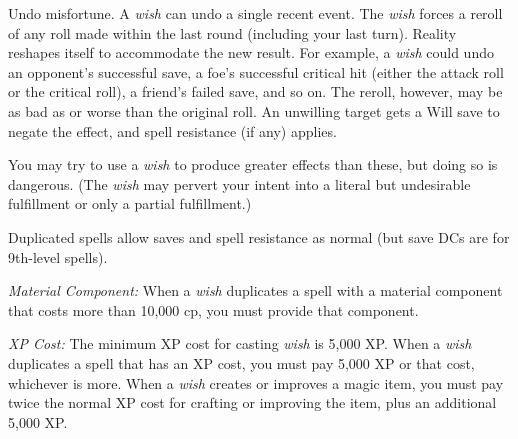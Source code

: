 {\begin{itemize*}
	\item Undo misfortune. A \emph{wish} can undo a single recent event. The \emph{wish} forces a reroll of any roll made within the last round (including your last turn). Reality reshapes itself to accommodate the new result. For example, a \emph{wish} could undo an opponent's successful save, a foe's successful critical hit (either the attack roll or the critical roll), a friend's failed save, and so on. The reroll, however, may be as bad as or worse than the original roll. An unwilling target gets a Will save to negate the effect, and spell resistance (if any) applies.
	\end{itemize*}

	You may try to use a \emph{wish} to produce greater effects than these, but doing so is dangerous. (The \emph{wish} may pervert your intent into a literal but undesirable fulfillment or only a partial fulfillment.)

	Duplicated spells allow saves and spell resistance as normal (but save DCs are for 9th-level spells).

	\textit{Material Component:}
	When a \emph{wish} duplicates a spell with a material component that costs more than 10,000 cp, you must provide that component.

	\textit{XP Cost:}
	The minimum XP cost for casting \emph{wish} is 5,000 XP. When a \emph{wish} duplicates a spell that has an XP cost, you must pay 5,000 XP or that cost, whichever is more. When a \emph{wish} creates or improves a magic item, you must pay twice the normal XP cost for crafting or improving the item, plus an additional 5,000 XP.

}
